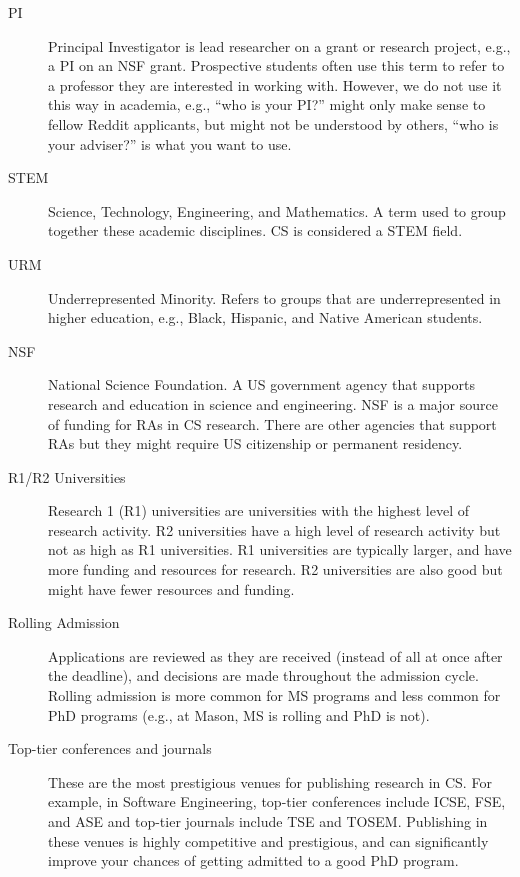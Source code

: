 \documentclass[oneside,11pt,dvipsnames]{book}
\begin{document}
\begin{description}
  \item [PI]  Principal Investigator is lead researcher on a grant or research project, e.g., a PI on an NSF grant.  Prospective students often use this term to refer to a professor they are interested in working with.  However, we do not use it this way in academia, e.g., ``who is your PI?'' might only make sense to fellow Reddit applicants, but might not be understood by others, ``who is your adviser?'' is what you want to use.
    \item[STEM] Science, Technology, Engineering, and Mathematics. A term used to group together these academic disciplines. CS is considered a STEM field.
  \item[URM] Underrepresented Minority. Refers to groups that are underrepresented in higher education, e.g., Black, Hispanic, and Native American students.
  \item[NSF] National Science Foundation. A US government agency that supports research and education in science and engineering. NSF is a major source of funding for RAs in CS research. There are other agencies that support RAs but they might require US citizenship or permanent residency.
        \item [R1/R2 Universities] Research 1 (R1) universities are universities with the highest level of research activity. R2 universities have a high level of research activity but not as high as R1 universities.  R1 universities are typically larger, and have more funding and resources for research.  R2 universities are also good but might have fewer resources and funding.
  
        \item [Rolling Admission] Applications are reviewed as they are received (instead of all at once after the deadline), and decisions are made throughout the admission cycle.  Rolling admission is more common for MS programs and less common for PhD programs (e.g., at Mason, MS is rolling and PhD is not).

  \item [Top-tier conferences and journals] These are the most prestigious venues for publishing research in CS.  For example, in Software Engineering, top-tier conferences include ICSE, FSE, and ASE and top-tier journals include TSE and TOSEM.  Publishing in these venues is highly competitive and prestigious, and can significantly improve your chances of getting admitted to a good PhD program.


\end{description}
\end{document}
